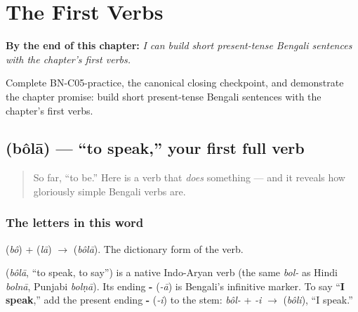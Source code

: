 
\chapter{The First Verbs}
\label{ch:first-verbs}

\begin{chapteropening}
\textbf{By the end of this chapter:} \emph{I can build short present-tense Bengali sentences with the chapter's first verbs.}

Complete BN-C05-practice, the canonical closing checkpoint, and demonstrate the chapter promise: build short present-tense Bengali sentences with the chapter's first verbs.
\end{chapteropening}

\section[bôlā]{ (bôlā) — \textquotedblleft{}to speak,\textquotedblright{} your first full verb}

\label{lesson:BN-C05-bola}



\begin{quote}
So far, \textquotedblleft{}to be.\textquotedblright{} Here is a verb that \emph{does} something — and it reveals how gloriously simple Bengali verbs are.
\end{quote}

\subsection*{The letters in this word}
\textbf{} (\emph{bô}) + \textbf{} (\emph{lā}) $\to$ \textbf{} (\emph{bôlā}). The dictionary form of the verb.

\begin{cousinweb}
\textbf{} (\emph{bôlā}, \textquotedblleft{}to speak, to say\textquotedblright{}) is a native Indo-Aryan verb (the same \emph{bol-} as Hindi \emph{bolnā}, Punjabi \emph{bolṇā}). Its ending \textbf{-} (\emph{-ā}) is Bengali's infinitive marker. To say \textquotedblleft{}\textbf{I speak},\textquotedblright{} add the present ending \textbf{-} (\emph{-i}) to the stem: \emph{bôl-} + \emph{-i} $\to$ \textbf{} (\emph{bôli}), \textquotedblleft{}I speak.\textquotedblright{}
\end{cousinweb}

